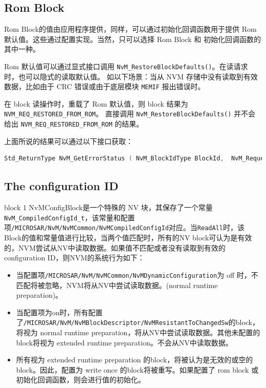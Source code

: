 \subsection{Rom Block}

Rom Block的值由应用程序提供，同样，可以通过初始化回调函数用于提供 Rom 默认值。这些通过配置实现。当然，只可以选择 Rom Block 和 初始化回调函数的其中一种。

Rom 默认值可以通过显式接口调用 \lstinline{NvM_RestoreBlockDefaults()}。在读请求时，也可以隐式的读取默认值。
如以下场景：当从 NVM 存储中没有读取到有效数据，比如由于 CRC 错误或由于底层模块 \lstinline{MEMIF} 报出错误时。

在 block 读操作时，重载了 Rom 默认值，则 block 结果为 \lstinline{NVM_REQ_RESTORED_FROM_ROM}。
直接调用 \lstinline{NvM_RestoreBlockDefaults()} 并不会给出 \lstinline{NVM_REQ_RESTORED_FROM_ROM} 的结果。

\begin{remark}
  上面所说的结果可以通过以下接口获取：
  \begin{lstlisting}[language=C,style=C]
  Std_ReturnType NvM_GetErrorStatus ( NvM_BlockIdType BlockId,  NvM_RequestResultType* RequestResultPtr)
  \end{lstlisting}
\end{remark}

\subsection{The configuration ID}

block 1 NvMConfigBlock是一个特殊的 NV 块，其保存了一个常量\lstinline{NvM_CompiledConfigId_t}，该常量和配置项\lstinline{/MICROSAR/NvM/NvMCommon/NvMCompiledConfigId}对应。当\lstinline{ReadAll}时，该Block的值和常量值进行比较，当两个值匹配时，所有的NV
block可认为是有效的，NVM尝试从NV中读取数据。如果值不匹配或者没有读取到有效的configuration ID，则NVM的系统行为如下：

\begin{itemize}
	\item
  当配置项\lstinline{/MICROSAR/NvM/NvMCommon/NvMDynamicConfiguration}为 off 时，不匹配将被忽略，NVM将从NV中尝试读取数据。(normal runtime preparation)。
	\item
  当配置项为on时，所有配置了\lstinline{/MICROSAR/NvM/NvMBlockDescriptor/NvMResistantToChangedSw}的block，将视为 normal runtime preparation，将从NV中尝试读取数据。其他未配置的block将视为 extended runtime preparation。不会从NV中读取数据。
	\item
  所有视为 extended runtime preparation 的block，将被认为是无效的或空的block。因此，配置为 write once 的block将被重写。如果配置了 rom block 或初始化回调函数，则会进行值的初始化。
\end{itemize}

